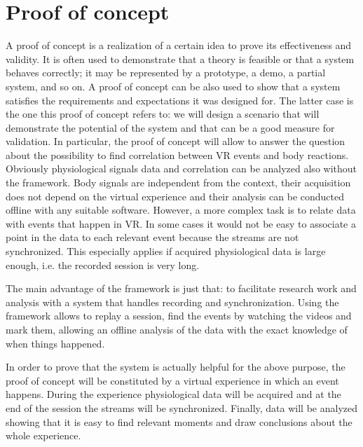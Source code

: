 \documentclass[binding=0.6cm,LaM]{sapthesis}
\begin{document}
\section{Proof of concept}
A proof of concept is a realization of a certain idea to prove its effectiveness and validity. It is often used to demonstrate that a theory is feasible or that a system behaves correctly; it may be represented by a prototype, a demo, a partial system, and so on. A proof of concept can be also used to show that a system satisfies the requirements and expectations it was designed for. The latter case is the one this proof of concept refers to: we will design a scenario that will demonstrate the potential of the system and that can be a good measure for validation. In particular, the proof of concept will allow to answer the question about the possibility to find correlation between VR events and body reactions. Obviously physiological signals data and correlation can be analyzed also without the framework. Body signals are independent from the context, their acquisition does not depend on the virtual experience and their analysis can be conducted offline with any suitable software. However, a more complex task is to relate data with events that happen in VR. In some cases it would not be easy to associate a point in the data to each relevant event because the streams are not synchronized. This especially applies if acquired physiological data is large enough, i.e. the recorded session is very long.

The main advantage of the framework is just that: to facilitate research work and analysis with a system that handles recording and synchronization. Using the framework allows to replay a session, find the events by watching the videos and mark them, allowing an offline analysis of the data with the exact knowledge of when things happened.

In order to prove that the system is actually helpful for the above purpose, the proof of concept will be constituted by a virtual experience in which an event happens. During the experience physiological data will be acquired and at the end of the session the streams will be synchronized. Finally, data will be analyzed showing that it is easy to find relevant moments and draw conclusions about the whole experience.
\end{document}
